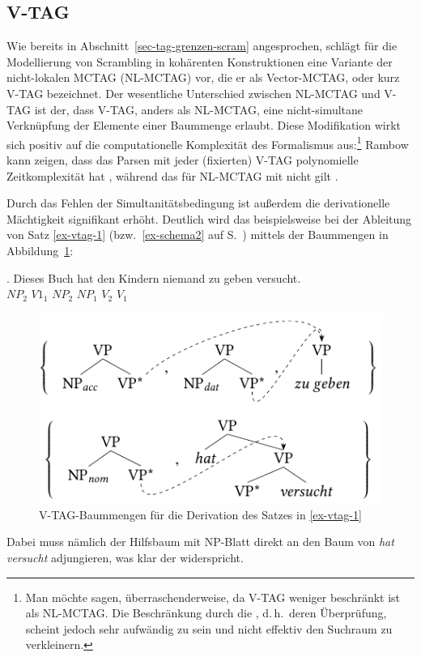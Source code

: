 \subsection{V-TAG}\label{sec-tag-varianten-vtag}
 
\largerpage[-1]
Wie bereits in Abschnitt~\ref{sec-tag-grenzen-scram} angesprochen, schlägt \cite{Rambow:94} für die Modellierung von Scrambling in kohärenten Konstruktionen eine Variante der nicht-lokalen MCTAG (NL-MCTAG) vor, die er als Vector-MCTAG, oder kurz V-TAG bezeichnet. Der wesentliche Unterschied zwischen NL-MCTAG und V-TAG ist der, dass V-TAG, anders als NL-MCTAG, eine nicht-simultane Verknüpfung der Elemente einer Baummenge erlaubt. Diese Modifikation wirkt sich positiv auf die computationelle Komplexität des Formalismus aus:\footnote{Man möchte sagen, überraschenderweise, da V-TAG weniger beschränkt ist als NL-MCTAG. Die Beschränkung durch die , d.\,h.\ deren Überprüfung, scheint jedoch sehr aufwändig zu sein und nicht effektiv den Suchraum zu verkleinern.} Rambow kann zeigen, dass das Parsen mit jeder (fixierten) V-TAG polynomielle Zeitkomplexität hat \citep[120ff]{Rambow:94}, während das für NL-MCTAG mit  nicht gilt \citep{Rambow:Satta:92,Champollion:11a}.
\largerpage%

Durch das Fehlen der Simultanitätsbedingung ist au\ss erdem die derivationelle Mächtigkeit signifikant erhöht. Deutlich wird das beispielsweise bei der Ableitung von Satz \ref{ex-vtag-1} (bzw.\ \ref{ex-schema2} auf S.~\pageref{ex-schema2}) mittels der Baummengen in Abbildung~\ref{fig-vtag-1}:

\exg. {Dieses Buch} hat {den Kindern} niemand {zu geben} versucht.  \\
$\mathit{NP}_2$ $V1_1$ $\mathit{NP}_2$ $\mathit{NP}_1$ $V_2$ $V_1$ \\
\citep[42]{Rambow:94} \label{ex-vtag-1}

\begin{figure}[h]
\centering
\includegraphics{graphics/abb66.pdf}
\caption{V-TAG-Baummengen für die Derivation des Satzes in \ref{ex-vtag-1}\label{fig-vtag-1}}
\end{figure}
Dabei muss nämlich der Hilfsbaum mit NP\subnom-Blatt direkt an den Baum von {\it hat versucht} adjungieren, was klar der  widerspricht.

